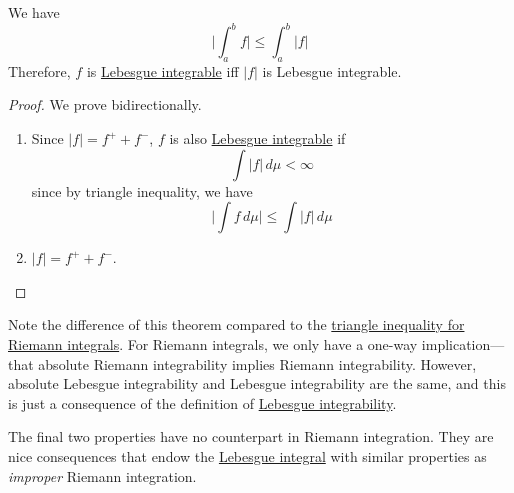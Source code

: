   \begin{corollary}
    \label{thm:tri-leb-int}
    We have
    \begin{equation}
      \bigg| \int_a^b f \bigg| \leq \int_a^b |f| 
    \end{equation}
    Therefore, $f$ is \hyperref[def:leb-int-signed]{Lebesgue integrable} iff $|f|$ is Lebesgue integrable. 
  \end{corollary}
  \begin{proof}
    We prove bidirectionally. 
    \begin{enumerate}
      \item Since $|f| = f^+ + f^-$, $f$ is also \hyperref[def:leb-int-signed]{Lebesgue integrable} if 
      \begin{equation}
        \int |f| \, d\mu < \infty 
      \end{equation}
      since by triangle inequality, we have 
      \begin{equation}
        \bigg| \int f \, d\mu \bigg| \leq \int |f| \, d \mu
      \end{equation}
      \item $|f| = f^+ + f^-$. 
    \end{enumerate}
  \end{proof}

  Note the difference of this theorem compared to the \hyperref[real-thm:triangle-int]{triangle inequality for Riemann integrals}. For Riemann integrals, we only have a one-way implication---that absolute Riemann integrability implies Riemann integrability. However, absolute Lebesgue integrability and Lebesgue integrability are the same, and this is just a consequence of the definition of \hyperref[def:leb-int-signed]{Lebesgue integrability}. 

  The final two properties have no counterpart in Riemann integration. They are nice consequences that endow the \hyperref[def:leb-int-signed]{Lebesgue integral} with similar properties as \textit{improper} Riemann integration. 

